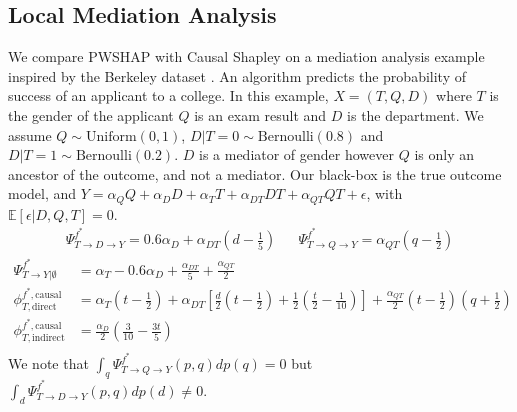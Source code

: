 \documentclass{article}
\theoremstyle{plain}
\theoremstyle{definition}
\theoremstyle{remark}
\newcommand{\effect}{\Psi}
\theoremstyle{mystyle}
\begin{document}
\subsection{Local Mediation Analysis} \label{subsec:local_mediation}

We compare PWSHAP with Causal Shapley on a mediation analysis example inspired by the Berkeley dataset . An algorithm predicts the probability of success of an applicant to a college. In this example, $X=(T,Q,D)$ where $T$ is the gender of the applicant $Q$ is an exam result and $D$ is the department. We assume $Q \sim \text{Uniform}(0,1)$, $D | T=0 \sim \text{Bernoulli}(0.8)$ and $D | T=1 \sim \text{Bernoulli}(0.2)$. $D$ is a mediator of gender however $Q$ is only an ancestor of the outcome, and not a mediator. Our black-box is the true outcome model, and $Y = \alpha_Q Q + \alpha_D D + \alpha_T T + \alpha_{DT} DT + \alpha_{QT} QT + \epsilon$, with $\mathbb{E}[\epsilon | D, Q, T] = 0$.
\begin{align*}
    \effect^{f^*}_{T \rightarrow D \rightarrow Y} = 0.6 \alpha_D + \alpha_{DT} (d - \frac{1}{5})  & & \effect^{f^*}_{T \rightarrow Q \rightarrow Y} = \alpha_{QT}(q - \frac{1}{2}) 
\end{align*}
\begin{align*}
    \effect^{f^*}_{T \rightarrow Y | \emptyset} &= \alpha_T - 0.6 \alpha_D + \frac{\alpha_{DT}}{5} + \frac{\alpha_{QT}}{2}  \\
    \phi^{f^*,\text{causal}}_{T,\text{direct}} &= \alpha_T(t - \frac{1}{2}) + \alpha_{DT}[\frac{d}{2}(t - \frac{1}{2}) + \frac{1}{2}(\frac{t}{2} - \frac{1}{10})] + \frac{\alpha_{QT}}{2}(t - \frac{1}{2})(q + \frac{1}{2}) \\
    \phi^{f^*,\text{causal}}_{T,\text{indirect}} &= \frac{\alpha_D}{2}  (\frac{3}{10} - \frac{3t}{5}) \\
\end{align*}
We note that $\int_{q} \effect^{f^*}_{T \rightarrow Q \rightarrow Y}(p,q) dp(q) = 0$ but $\int_{d} \effect^{f^*}_{T \rightarrow D \rightarrow Y}(p,q) dp(d) \neq 0$.
\end{document}
